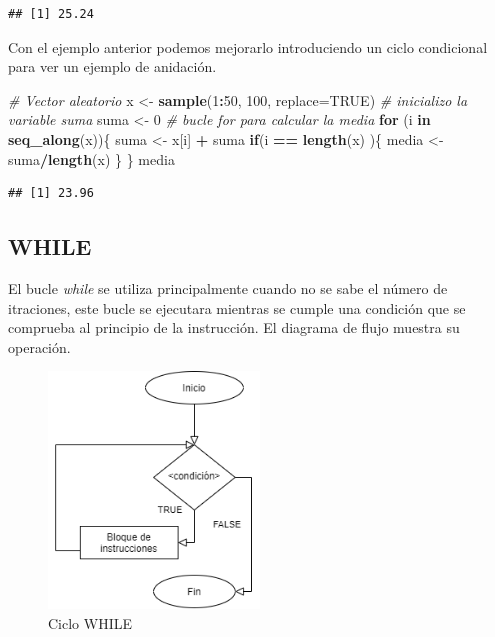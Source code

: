 \documentclass[11pt,]{article}
\newenvironment{Shaded}{\begin{snugshade}}{\end{snugshade}}
\newcommand{\CommentTok}[1]{\textcolor[rgb]{0.56,0.35,0.01}{\textit{#1}}}
\newcommand{\ControlFlowTok}[1]{\textcolor[rgb]{0.13,0.29,0.53}{\textbf{#1}}}
\newcommand{\DataTypeTok}[1]{\textcolor[rgb]{0.13,0.29,0.53}{#1}}
\newcommand{\DecValTok}[1]{\textcolor[rgb]{0.00,0.00,0.81}{#1}}
\newcommand{\KeywordTok}[1]{\textcolor[rgb]{0.13,0.29,0.53}{\textbf{#1}}}
\newcommand{\NormalTok}[1]{#1}
\newcommand{\OperatorTok}[1]{\textcolor[rgb]{0.81,0.36,0.00}{\textbf{#1}}}
\newcommand{\OtherTok}[1]{\textcolor[rgb]{0.56,0.35,0.01}{#1}}
\newcommand{\StringTok}[1]{\textcolor[rgb]{0.31,0.60,0.02}{#1}}
\begin{document}
\begin{verbatim}
## [1] 25.24
\end{verbatim}

Con el ejemplo anterior podemos mejorarlo introduciendo un ciclo
condicional para ver un ejemplo de anidación.

\begin{Shaded}
\begin{Highlighting}[]
\CommentTok{# Vector aleatorio}
\NormalTok{x <-}\StringTok{ }\KeywordTok{sample}\NormalTok{(}\DecValTok{1}\OperatorTok{:}\DecValTok{50}\NormalTok{, }\DecValTok{100}\NormalTok{, }\DataTypeTok{replace=}\OtherTok{TRUE}\NormalTok{)}
\CommentTok{# inicializo la variable suma}
\NormalTok{suma <-}\StringTok{ }\DecValTok{0}
\CommentTok{# bucle for para calcular la media}
\ControlFlowTok{for}\NormalTok{ (i }\ControlFlowTok{in} \KeywordTok{seq_along}\NormalTok{(x))\{}
\NormalTok{  suma <-}\StringTok{ }\NormalTok{x[i] }\OperatorTok{+}\StringTok{ }\NormalTok{suma}
  \ControlFlowTok{if}\NormalTok{(i }\OperatorTok{==}\StringTok{ }\KeywordTok{length}\NormalTok{(x) )\{}
\NormalTok{    media <-}\StringTok{ }\NormalTok{suma}\OperatorTok{/}\KeywordTok{length}\NormalTok{(x)}
\NormalTok{  \}}
\NormalTok{\}}
\NormalTok{media}
\end{Highlighting}
\end{Shaded}

\begin{verbatim}
## [1] 23.96
\end{verbatim}

\hypertarget{while}{%
\subsection{WHILE}\label{while}}

El bucle \emph{while} se utiliza principalmente cuando no se sabe el
número de itraciones, este bucle se ejecutara mientras se cumple una
condición que se comprueba al principio de la instrucción. El diagrama
de flujo muestra su operación.

\begin{figure}
\hypertarget{id}{%
\centering
\includegraphics[width=0.5\textwidth,height=0.3\textheight]{../schemas/WHILE.png}
\caption{Ciclo WHILE}\label{id}
}
\end{figure}
\end{document}
